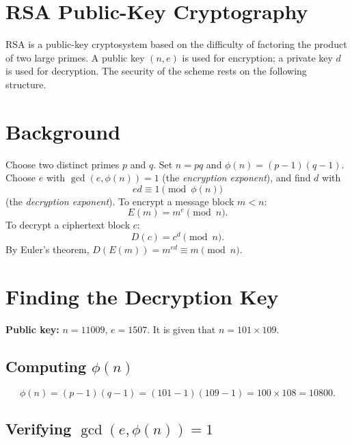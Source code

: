 \section{RSA Public-Key Cryptography}

RSA is a public-key cryptosystem based on the difficulty of factoring the
product of two large primes. A public key $(n, e)$ is used for encryption;
a private key $d$ is used for decryption. The security of the scheme rests on
the following structure.

\section{Background}

Choose two distinct primes $p$ and $q$. Set $n = pq$ and $\phi(n) = (p-1)(q-1)$.
Choose $e$ with $\gcd(e, \phi(n)) = 1$ (the \emph{encryption exponent}), and
find $d$ with
\[
    ed \equiv 1 \pmod{\phi(n)}
\]
(the \emph{decryption exponent}). To encrypt a message block $m < n$:
\[
    E(m) = m^e \pmod{n}.
\]
To decrypt a ciphertext block $c$:
\[
    D(c) = c^d \pmod{n}.
\]
By Euler's theorem, $D(E(m)) = m^{ed} \equiv m \pmod{n}$.

\section{Finding the Decryption Key}

\textbf{Public key:} $n = 11009$, $e = 1507$. It is given that $n = 101 \times 109$.

\subsection{Computing \texorpdfstring{$\phi(n)$}{φ(n)}}

\[
    \phi(n) = (p-1)(q-1) = (101-1)(109-1) = 100 \times 108 = 10800.
\]

\subsection{Verifying \texorpdfstring{$\gcd(e, \phi(n)) = 1$}{gcd(e,φ(n))=1}}

